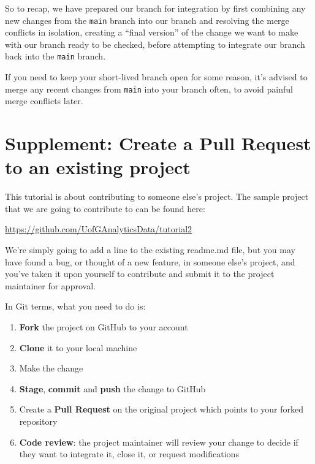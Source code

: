 \documentclass[
  letterpaper,
  DIV=11,
  numbers=noendperiod]{scrartcl}
\providecommand{\tightlist}{%
  \setlength{\itemsep}{0pt}\setlength{\parskip}{0pt}}\usepackage{longtable,booktabs,array}
\begin{document}
So to recap, we have prepared our branch for integration by first
combining any new changes from the \texttt{main} branch into our branch
and resolving the merge conflicts in isolation, creating a ``final
version'' of the change we want to make with our branch ready to be
checked, before attempting to integrate our branch back into the
\texttt{main} branch.

If you need to keep your short-lived branch open for some reason, it's
advised to merge any recent changes from \texttt{main} into your branch
often, to avoid painful merge conflicts later.

\hypertarget{supplement-create-a-pull-request-to-an-existing-project}{%
\section{Supplement: Create a Pull Request to an existing
project}\label{supplement-create-a-pull-request-to-an-existing-project}}

This tutorial is about contributing to someone else's project. The
sample project that we are going to contribute to can be found here:

\url{https://github.com/UofGAnalyticsData/tutorial2}

We're simply going to add a line to the existing readme.md file, but you
may have found a bug, or thought of a new feature, in someone else's
project, and you've taken it upon yourself to contribute and submit it
to the project maintainer for approval.

In Git terms, what you need to do is:

\begin{enumerate}
\def\labelenumi{\arabic{enumi}.}
\tightlist
\item
  \textbf{Fork} the project on GitHub to your account
\item
  \textbf{Clone} it to your local machine
\item
  Make the change
\item
  \textbf{Stage}, \textbf{commit} and \textbf{push} the change to GitHub
\item
  Create a \textbf{Pull Request} on the original project which points to
  your forked repository
\item
  \textbf{Code review}: the project maintainer will review your change
  to decide if they want to integrate it, close it, or request
  modifications
\end{enumerate}
\end{document}
